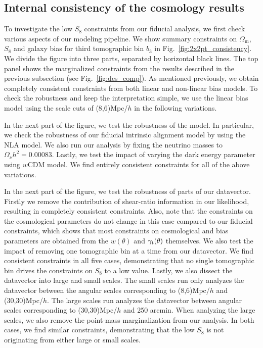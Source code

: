 \documentclass[fleqn,usenatbib]{mnras}
\newcommand{\gammat}{\ensuremath{\gamma_{\rm t}(\theta)}}
\newcommand{\wtheta}{\ensuremath{w(\theta)}}
\newcommand{\om}{\ensuremath{\Omega_{\mathrm m}}}
\begin{document}
\subsection{Internal consistency of the cosmology results}
\label{sec:internal_consistency}

To investigate the low $S_8$ constraints from our fiducial analysis, we first check various aspects of our modeling pipeline. We show summary constraints on $\om$, $S_8$ and galaxy bias for third tomographic bin $b_3$ in Fig.~\ref{fig:2x2pt_consistency}. We divide the figure into three parts, separated by horizontal black lines. The top panel shows the marginalized constraints from the results described in the previous subsection (see Fig.~\ref{fig:des_comp}). As mentioned previously, we obtain completely consistent constraints from both linear and non-linear bias models. To check the robustness and keep the interpretation simple, we use the linear bias model using the scale cuts of (8,6)Mpc/$h$ in the following variations.  

In the next part of the figure, we test the robustness of the model. In particular, we check the robustness of our fiducial intrinsic alignment model by using the NLA model. We also run our analysis by fixing the neutrino masses to $\Omega_{\nu}h^2 = 0.00083$. Lastly, we test the impact of varying the dark energy parameter using $w$CDM model. We find entirely consistent constraints for all of the above variations. 

In the next part of the figure, we test the robustness of parts of our datavector. Firstly we remove the contribution of shear-ratio information in our likelihood, resulting in completely consistent constraints. Also, note that the constraints on the cosmological parameters do not change in this case compared to our fiducial constraints, which shows that most constraints on cosmological and bias parameters are obtained from the $\wtheta$ and $\gammat$ themselves. We also test the impact of removing one tomographic bin at a time from our datavector. We find consistent constraints in all five cases, demonstrating that no single tomographic bin drives the constraints on $S_8$ to a low value. Lastly, we also dissect the datavector into large and small scales. The small scales run only analyzes the datavector between the angular scales corresponding to (8,6)Mpc/$h$ and (30,30)Mpc/$h$. The large scales run analyzes the datavector between angular scales corresponding to (30,30)Mpc/$h$ and 250 arcmin. When analyzing the large scales, we also remove the point-mass marginalization from our analysis. In both cases, we find similar constraints, demonstrating that the low $S_8$ is not originating from either large or small scales.
\end{document}
